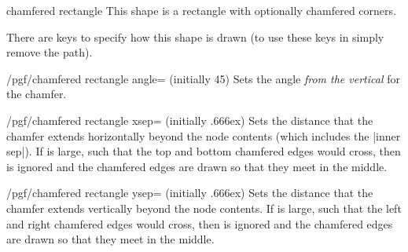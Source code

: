 \begin{shape}{chamfered rectangle}
    This shape is a rectangle with optionally chamfered corners.
\begin{codeexample}[preamble={\usetikzlibrary{shapes.misc}}]
\end{codeexample}

    There are \pgfname{} keys to specify how this shape is drawn (to use these
    keys in \tikzname{} simply remove the  path).

    \begin{key}{/pgf/chamfered rectangle angle= (initially 45)}
        Sets the angle \emph{from the vertical} for the chamfer.
\begin{codeexample}[preamble={\usetikzlibrary{shapes.misc}}]
\end{codeexample}
    \end{key}

    \begin{key}{/pgf/chamfered rectangle xsep= (initially .666ex)}
        Sets the distance that the chamfer extends horizontally beyond the node
        contents (which includes the |inner sep|). If  is large,
        such that the top and bottom chamfered edges would cross, then
         is ignored and the chamfered edges are drawn so that they
        meet in the middle.
\begin{codeexample}[preamble={\usetikzlibrary{shapes.misc}}]
\end{codeexample}
    \end{key}

    \begin{key}{/pgf/chamfered rectangle ysep= (initially .666ex)}
        Sets the distance that the chamfer extends vertically beyond the node
        contents. If  is large, such that the left and right
        chamfered edges would cross, then  is ignored and the
        chamfered edges are drawn so that they meet in the middle.
    \end{key}


\end{shape}
